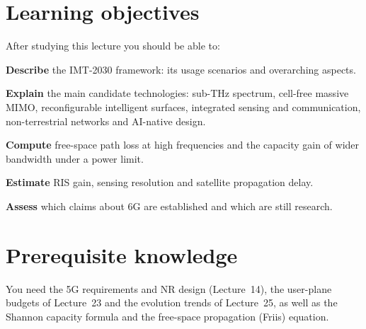 \documentclass[11pt,a4paper]{article}
\begin{document}
\ACNcover

\section{Learning objectives}
After studying this lecture you should be able to:
\begin{objectives}
  \item \textbf{Describe} the IMT-2030 framework: its usage scenarios and overarching aspects.
  \item \textbf{Explain} the main candidate technologies: sub-THz spectrum, cell-free massive MIMO, reconfigurable intelligent surfaces,
        integrated sensing and communication, non-terrestrial networks and AI-native design.
  \item \textbf{Compute} free-space path loss at high frequencies and the capacity gain of wider bandwidth under a power limit.
  \item \textbf{Estimate} RIS gain, sensing resolution and satellite propagation delay.
  \item \textbf{Assess} which claims about 6G are established and which are still research.
\end{objectives}

\section{Prerequisite knowledge}
You need the 5G requirements and NR design (Lecture~14), the user-plane budgets of Lecture~23 and the evolution trends of Lecture~25, as well as
the Shannon capacity formula and the free-space propagation (Friis) equation.
\end{document}
